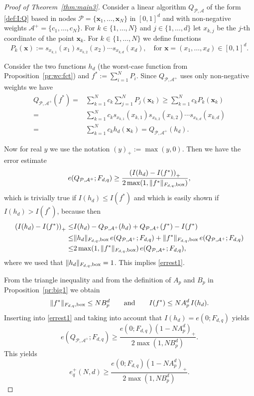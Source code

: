 \documentclass[12pt]{article}
\theoremstyle{remark}
\theoremstyle{definition}
\newcommand{\bx}{{\rm box}}
\newcommand{\bsx}{{\boldsymbol x}}
\newcommand{\cP}{\mathcal{P}}
\newcommand{\cA}{\mathcal{A}}
\newcommand{\<}{\langle}
\renewcommand{\>}{\rangle}
\begin{document}
\begin{proof}[Proof of Theorem~\ref{thm:main3}]
Consider a linear algorithm $Q_{\cP,\cA}$ of the form \eqref{def:I:Q} based in nodes $\cP=\{\bsx_1,\ldots,\bsx_N\}$ in $[0,1]^d$ and with non-negative weights $\cA^+=\{c_1,\ldots,c_N\}$.  For $k \in \{1,\ldots,N\}$ and $j \in \{1,\ldots,d\}$ let $x_{k,j}$ be the $j$-th coordinate of the point $\bsx_k$. For $k \in \{1,\ldots,N\}$ we define functions 
$$
P_k(\bsx) := s_{x_{k,1}}(x_1) s_{x_{k,2}}(x_2) \cdots s_{x_{k,d}}(x_d),\quad \mbox{for $\bsx=(x_1,\ldots,x_d)\in [0,1]^d$.}  
$$

Consider the two functions $h_d$ (the worst-case function from Proposition~\ref{pr:wc:fct}) and $f^*:= \sum_{i=1}^N P_i$.
Since $Q_{\cP,\cA^+}$ uses only non-negative weights we have 
\begin{align*}
Q_{\cP,\cA^+}(f^*) = & \sum_{k=1}^N c_k \sum_{j=1}^N P_j(\bsx_k) \ge \sum_{k=1}^N c_k P_k(\bsx_k)\\
= & \sum_{k=1}^N c_k s_{x_{k,1}}(x_{k,1}) s_{x_{k,2}}(x_{k,2}) \cdots s_{x_{k,d}}(x_{k,d}) \\
= & \sum_{k=1}^N c_k h_d(\bsx_k) = Q_{\cP,\cA^+}(h_d).
\end{align*}


Now for real $y$ we use the notation $(y)_+:= \max (y, 0)$.  Then we have the error estimate 
\begin{equation}\label{errest1}
e(Q_{\cP,\cA^+};F_{d,q})  \ge \frac{ \left(I(h_d) - I(f^*)\right)_+}{2 \max ( 1, \| f^* \|_{F_{d,q},\bx})},
\end{equation}
which is trivially true if $I(h_d) \le  I(f^*)$ and which is easily shown if $I(h_d) >  I(f^*)$, because then 
\begin{align*}
\left(I(h_d) - I(f^*)\right)_+ \le & I(h_d) - Q_{\cP,\cA^+}(h_d)+Q_{\cP,\cA^+}(f^*)-I(f^*)\\
\le & \|h_d\|_{F_{d,q},\bx} \, e(Q_{\cP,\cA^+};F_{d,q})+\|f^*\|_{F_{d,q},\bx} \, e(Q_{\cP,\cA^+};F_{d,q})\\
\le & 2 \max(1,\|f^*\|_{F_{d,q},\bx}) \, e(Q_{\cP,\cA^+};F_{d,q}),
\end{align*}
where we used that $\|h_d\|_{F_{d,q},\bx}=1$. This implies \eqref{errest1}.

From the triangle inequality and from the definition of $A_p$ and $B_p$ in Proposition~\ref{pr:big1} we obtain 
$$
\| f^* \|_{F_{d,q},\bx} \le N B_p^d \qquad \mbox{and} \qquad I(f^*) \le N  A_p^d \, I(h_d).
$$ 
Inserting into \eqref{errest1} and taking into account that $I(h_d)= e(0;F_{d,q})$ yields 
$$
e(Q_{\cP,\cA^+};F_{d,q}) \ge \frac{ e(0;F_{d,q})  \left(1- N A_p^d\right)_+} {2 \max (1, 
N B_p^d) }.
$$
This yields  
\begin{equation*}
e_q^+(N,d)\ge \frac{ e(0;F_{d,q})  \left(1- N A_p^d\right)_+} {2 \max (1, 
N B_p^d) }.
\end{equation*}


\end{proof}
\end{document}
